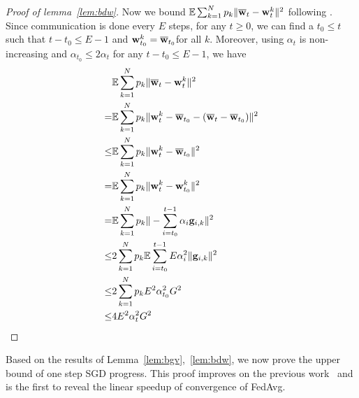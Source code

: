 \begin{proof}[Proof of lemma~\ref{lem:bdw}]
	Now we bound $\mathbb{E}\sum_{k=1}^{N}p_{k}\|{\overline{\mathbf{w}}}_{t}-{\mathbf{w}}_{t}^{k}\|^{2}$ following \cite{li2019convergence}.
	Since communication is done every $E$ steps, for any $t\geq0$, we
	can find a $t_{0}\leq t$ such that $t-t_{0}\leq E-1$ and ${\mathbf{w}}_{t_{0}}^{k}={\overline{\mathbf{w}}}_{t_{0}}$for
	all $k$. Moreover, using $\alpha_{t}$ is non-increasing and $\alpha_{t_{0}}\leq2\alpha{}_{t}$
	for any $t-t_{0}\leq E-1$, we have 
		\begin{align*}
	& \mathbb{E}\sum_{k=1}^{N}p_{k}\|{\overline{\mathbf{w}}}_{t}-{\mathbf{w}}_{t}^{k}\|^{2}\\
= & \mathbb{E}\sum_{k=1}^{N}p_{k}\|{\mathbf{w}}_{t}^{k}-{\overline{\mathbf{w}}}_{t_{0}}-({\overline{\mathbf{w}}}_{t}-{\overline{\mathbf{w}}}_{t_{0}})\|^{2}\\
\leq &\mathbb{E}\sum_{k=1}^{N}p_{k}\|{\mathbf{w}}_{t}^{k}-{\overline{\mathbf{w}}}_{t_{0}}\|^{2}\\
	= &\mathbb{E}\sum_{k=1}^{N}p_{k}\|{\mathbf{w}}_{t}^{k}-{\mathbf{w}}_{t_{0}}^{k}\|^{2}\\
	= &\mathbb{E}\sum_{k=1}^{N}p_{k}\|-\sum_{i=t_{0}}^{t-1}\alpha_{i}{\mathbf{g}}_{i,k}\|^{2}\\
	\leq & 2\sum_{k=1}^{N}p_{k}\mathbb{E}\sum_{i=t_{0}}^{t-1}E\alpha_{i}^{2}\|{\mathbf{g}}_{i,k}\|^{2}\\
	\leq & 2\sum_{k=1}^{N}p_{k}E^{2}\alpha_{t_{0}}^{2}G^{2}\\
	\leq & 4E^{2}\alpha_{t}^{2}G^{2}
	\end{align*}
\end{proof}
Based on the results of Lemma~\ref{lem:bgv},~\ref{lem:bdw}, we now prove the upper bound of one step SGD progress. This 
proof improves on the previous work~\cite{li2019convergence} and is the first to reveal the linear speedup of convergence of FedAvg. 
